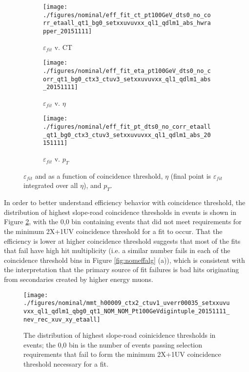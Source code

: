 \begin{figure}[!htbp]\captionsetup{justification=centering}\captionsetup{justification=centering}
  \begin{center}
    \begin{subfigure}{0.3\textwidth}\texttt{[image: ./figures/nominal/eff\_fit\_ct\_pt100GeV\_dts0\_no\_corr\_etaall\_qt1\_bg0\_setxxuvuvxx\_ql1\_qdlm1\_abs\_hwrapper\_20151111]}\caption{$\varepsilon_{fit}$ v. CT}\end{subfigure}
    \begin{subfigure}{0.3\textwidth}\texttt{[image: ./figures/nominal/eff\_fit\_eta\_pt100GeV\_dts0\_no\_corr\_qt1\_bg0\_ctx3\_ctuv3\_setxxuvuvxx\_ql1\_qdlm1\_abs\_20151111]}\caption{$\varepsilon_{fit}$ v. $\eta$}\end{subfigure}
    \begin{subfigure}{0.3\textwidth}\texttt{[image: ./figures/nominal/eff\_fit\_pt\_dts0\_no\_corr\_etaall\_qt1\_bg0\_ctx3\_ctuv3\_setxxuvuvxx\_ql1\_qdlm1\_abs\_20151111]}\caption{$\varepsilon_{fit}$ v. $p_T$}\end{subfigure}
  \caption{\label{fig:nomefffit} $\varepsilon_{fit}$ and as a function of coincidence threshold, $\eta$ (final point is $\varepsilon_{fit}$ integrated over all $\eta$), and $p_T$.}
  \end{center}
\end{figure}

In order to better understand efficiency behavior with coincidence threshold, the distribution of highest slope-road coincidence thresholds in events is shown in Figure \ref{fig:ctrecodist}, with the 0,0 bin containing events that did not meet requirements for the minimum 2X+1UV coincidence threshold for a fit to occur.  That the efficiency is lower at higher coincidence threshold suggests that most of the fits that fail have high hit multiplicity (i.e. a similar number fails in each of the coincidence threshold bins in Figure \ref{fig:nomeffalg} (a)), which is consistent with the interpretation that the primary source of fit failures is bad hits originating from secondaries created by higher energy muons.

\begin{figure}[!htbp]\captionsetup{justification=centering}\captionsetup{justification=centering}
  \centering
  \texttt{[image: ./figures/nominal/mmt\_h00009\_ctx2\_ctuv1\_uverr00035\_setxxuvuvxx\_ql1\_qdlm1\_qbg0\_qt1\_NOM\_NOM\_Pt100GeVdigintuple\_20151111\_nev\_rec\_xuv\_xy\_etaall]}
  \caption{\label{fig:ctrecodist} The distribution of highest slope-road coinicidence thresholds in events; the 0,0 bin is the number of events passing selection requirements that fail to form the minimum 2X+1UV coincidence threshold necessary for a fit.}
\end{figure}

